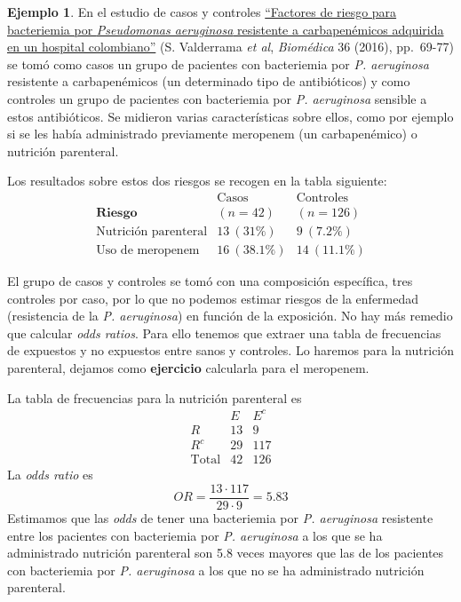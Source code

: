 \documentclass[
]{book}
\theoremstyle{definition}
\theoremstyle{definition}
\newtheorem{example}{Ejemplo}[chapter]
\theoremstyle{definition}
\theoremstyle{definition}
\theoremstyle{remark}
\begin{document}
\begin{example}
\protect\hypertarget{exm:unnamed-chunk-194}{}\label{exm:unnamed-chunk-194}En el estudio de casos y controles \href{https://www.redalyc.org/pdf/843/84346573010.pdf}{``Factores de riesgo para bacteriemia por \emph{Pseudomonas aeruginosa} resistente a carbapenémicos adquirida en un hospital colombiano''} (S. Valderrama \emph{et al}, \emph{Biomédica} 36 (2016), pp.~69-77) se tomó como casos un grupo de pacientes con bacteriemia por \emph{P. aeruginosa} resistente a carbapenémicos (un determinado tipo de antibióticos) y como controles un grupo de pacientes con bacteriemia por \emph{P. aeruginosa} sensible a estos antibióticos. Se midieron varias características sobre ellos, como por ejemplo si se les había administrado previamente meropenem (un carbapenémico) o nutrición parenteral.
\end{example}

Los resultados sobre estos dos riesgos se recogen en la tabla siguiente:
\[ 
\begin{array}{r|cc}
&\text{Casos} &\text{Controles} \\[-0.5ex]
\textbf{Riesgo} & (n=42) & (n=126) \\ \hline
 \text{Nutrición parenteral} & 13\ (31\%) & 9\ (7.2\%) \\ \hline
 \text{Uso de meropenem} & 16\ (38.1\%) & 14\ (11.1\%)
 \end{array}
\]

El grupo de casos y controles se tomó con una composición específica, tres controles por caso, por lo que no podemos estimar riesgos de la enfermedad (resistencia de la \emph{P. aeruginosa}) en función de la exposición. No hay más remedio que calcular \emph{odds ratios}. Para ello tenemos que extraer una tabla de frecuencias de expuestos y no expuestos entre sanos y controles. Lo haremos para la nutrición parenteral, dejamos como \textbf{ejercicio} calcularla para el meropenem.

La tabla de frecuencias para la nutrición parenteral es
\[ 
\begin{array}{r|cc}
&E &E^c \\ \hline
R & 13  & 9  \\ 
R^c & 29 & 117\\ \hline
\text{Total} & 42 & 126
 \end{array}
\]
La \emph{odds ratio} es
\[
OR=\frac{13\cdot 117}{29\cdot 9}=5.83
\]
Estimamos que las \emph{odds} de tener una bacteriemia por \emph{P. aeruginosa} resistente entre los pacientes con bacteriemia por \emph{P. aeruginosa} a los que se ha administrado nutrición parenteral son 5.8 veces mayores que las de los pacientes con bacteriemia por \emph{P. aeruginosa} a los que no se ha administrado nutrición parenteral.
\end{document}
